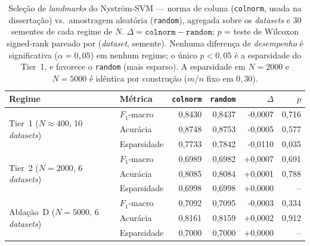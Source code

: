\begin{table}[ht]
  \centering
  \caption{Seleção de \emph{landmarks} do Nyström-SVM --- norma de coluna (\texttt{colnorm}, usada na dissertação) vs.\ amostragem aleatória (\texttt{random}), agregada sobre os \emph{datasets} e 30 sementes de cada regime de $N$. $\Delta = \texttt{colnorm} - \texttt{random}$; $p$ = teste de Wilcoxon signed-rank pareado por (\emph{dataset}, semente). Nenhuma diferença de \emph{desempenho} é significativa ($\alpha=0{,}05$) em nenhum regime; o único $p<0{,}05$ é a esparsidade do Tier~1, e favorece o \texttt{random} (mais esparso). A esparsidade em $N{=}2000$ e $N{=}5000$ é idêntica por construção ($m/n$ fixo em $0{,}30$).}
  \label{tab:nystrom_selection}
  \begin{tabular}{llrrrr}
    \toprule
    Regime & Métrica & \texttt{colnorm} & \texttt{random} & $\Delta$ & $p$ \\
    \midrule
    \multirow{3}{*}{Tier~1 ($N{\approx}400$, 10 \emph{datasets})} & $F_1$-macro & 0,8430 & 0,8437 & -0,0007 & 0,716 \\
     & Acurácia & 0,8748 & 0,8753 & -0,0005 & 0,577 \\
     & Esparsidade & 0,7733 & 0,7842 & -0,0110 & 0,035 \\
    \midrule
    \multirow{3}{*}{Tier~2 ($N{=}2000$, 6 \emph{datasets})} & $F_1$-macro & 0,6989 & 0,6982 & +0,0007 & 0,691 \\
     & Acurácia & 0,8085 & 0,8084 & +0,0001 & 0,788 \\
     & Esparsidade & 0,6998 & 0,6998 & +0,0000 & -- \\
    \midrule
    \multirow{3}{*}{Ablação~D ($N{=}5000$, 6 \emph{datasets})} & $F_1$-macro & 0,7092 & 0,7095 & -0,0003 & 0,334 \\
     & Acurácia & 0,8161 & 0,8159 & +0,0002 & 0,912 \\
     & Esparsidade & 0,7000 & 0,7000 & +0,0000 & -- \\
    \bottomrule
  \end{tabular}
\end{table}
